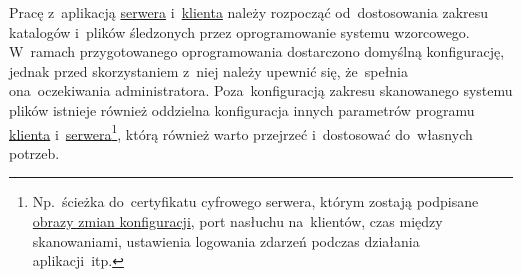 \documentclass[thesis]{subfiles}
\begin{document}
Pracę z~aplikacją \hyperref[sec:srv-app]{serwera} i~\hyperref[sec:cli-app]{klienta} należy rozpocząć od~dostosowania zakresu katalogów i~plików śledzonych przez oprogramowanie systemu wzorcowego. W~ramach przygotowanego oprogramowania dostarczono domyślną konfigurację, jednak przed skorzystaniem z~niej należy upewnić się, że~spełnia ona~oczekiwania administratora. Poza~konfiguracją zakresu skanowanego systemu plików istnieje również oddzielna konfiguracja innych parametrów programu \hyperref[sec:cli-app]{klienta} i~\hyperref[sec:srv-app]{serwera}\footnote{Np.~ścieżka do~certyfikatu cyfrowego serwera, którym zostają podpisane \hyperref[sec:obraz-zmian-konfiguracji]{obrazy zmian konfiguracji}, port nasłuchu na~klientów, czas między skanowaniami, ustawienia logowania zdarzeń podczas działania aplikacji~itp.}, którą również warto przejrzeć i~dostosować do~własnych potrzeb.
\end{document}
